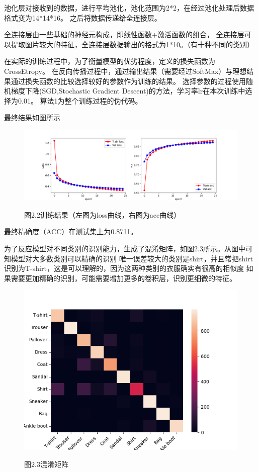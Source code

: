 \documentclass[10.5pt,compsoc,UTF8]{CjC}
\theoremstyle{mystyle}
\begin{document}
池化层对接收到的数据，进行平均池化，池化范围为2*2，在经过池化处理后数据格式变为14*14*16。
之后将数据传递给全连接层。

全连接层由一些基础的神经元构成，即线性函数+激活函数的组合，
全连接层可以提取图片较大的特征，全连接层数据输出的格式为1*10。（有十种不同的类别）

 

在实际的训练过程中，为了衡量模型的优劣程度，定义的损失函数为CrossEtropy。
在反向传播过程中，通过输出结果（需要经过SoftMax）与理想结果通过损失函数的比较选择较好的参数作为训练的结果。
选择参数的过程使用随机梯度下降(SGD,Stochastic Gradient Descent)的方法，学习率lr在本次训练中选择为0.01。
算法1为整个训练过程的伪代码。

最终结果如图所示

\begin{figure}[htbp]
\centering
\vspace {-10mm}
\centerline{\includegraphics[width=1\linewidth]{CNN22.png}}
\heiti 图2.2\quad  训练结果（左图为loss曲线，右图为acc曲线）
\label{fig1}
\end{figure}

最终精确度（ACC）在测试集上为0.8711。

为了反应模型对不同类别的识别能力，生成了混淆矩阵，如图2.3所示。从图中可知模型对大多数类别可以精确的识别
唯一误差较大的类别是shirt，并且常把shirt识别为T-shirt，这是可以理解的，因为这两种类别的衣服确实有很高的相似度
如果需要更加精确的识别，可能需要增加更多的卷积层，识别更细微的特征。


\begin{figure}[htbp]
\centering
\vspace {-5mm}
\centerline{\includegraphics[width=0.7\linewidth]{CNN23.png}}
\heiti 图2.3\quad  混淆矩阵
\label{fig1}
\end{figure}
\end{document}
